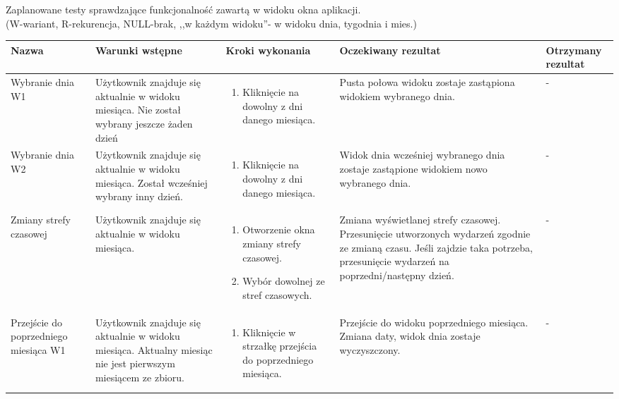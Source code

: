 \documentclass{article}
\begin{document}
\begin{flushleft}
Zaplanowane testy sprawdzające funkcjonalność zawartą w widoku okna aplikacji. \\
(W-wariant, R-rekurencja, NULL-brak, ,,w każdym widoku''- w widoku dnia, tygodnia i mies.)
\setlength\LTleft{-1in}

	\begin{longtable}[H]{| m{3.5cm} | m{3.5cm} | m{3.5cm} | m{3.5cm} | m{3.5cm} |} \hline
	Nazwa & Warunki wstępne & Kroki wykonania & Oczekiwany rezultat & Otrzymany rezultat \\ \hline

	Wybranie dnia W1 & Użytkownik znajduje się aktualnie w widoku miesiąca. Nie został wybrany jeszcze żaden dzień & \begin{enumerate}[leftmargin =*, topsep=0pt] \item Kliknięcie na dowolny z 
	dni danego miesiąca. \end{enumerate} & Pusta połowa widoku zostaje zastąpiona widokiem wybranego dnia. & - \\ \hline
	
	Wybranie dnia W2 & Użytkownik znajduje się aktualnie w widoku miesiąca. Został wcześniej wybrany inny dzień. & \begin{enumerate}[leftmargin =*, topsep=0pt] \item Kliknięcie na dowolny z dni 
	danego miesiąca. \end{enumerate} & Widok dnia wcześniej wybranego dnia zostaje zastąpione widokiem nowo wybranego dnia. & - \\ \hline

	Zmiany strefy czasowej & Użytkownik znajduje się aktualnie w widoku miesiąca. & \begin{enumerate}[leftmargin =*, topsep=0pt] \item Otworzenie okna zmiany strefy czasowej. \item Wybór 
	dowolnej ze stref czasowych. \end{enumerate} & Zmiana wyświetlanej strefy czasowej. Przesunięcie utworzonych wydarzeń zgodnie ze zmianą czasu. Jeśli zajdzie taka potrzeba, przesunięcie 
	wydarzeń na poprzedni/następny dzień. & - \\ \hline

	Przejście do poprzedniego miesiąca W1 & Użytkownik znajduje się aktualnie w widoku miesiąca. Aktualny miesiąc nie jest pierwszym miesiącem ze zbioru. & \begin{enumerate}[leftmargin =*, 
	topsep=0pt] \item Kliknięcie w strzałkę przejścia do poprzedniego miesiąca. \end{enumerate} & Przejście do widoku poprzedniego miesiąca. Zmiana daty, widok dnia zostaje wyczyszczony. & 
	- \\ \hline


\end{longtable}
\end{flushleft}
\end{document}
